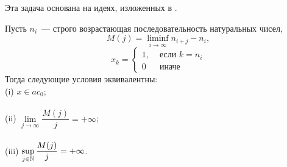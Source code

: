
Эта задача основана на идеях, изложенных в \cite[\S 5]{Semenov2014geomprops}.

\begin{theorem}
	\label{thm:M_j_ac0_inf_lim}
	Пусть $n_i$~--- строго возрастающая последовательность натуральных чисел,
	\begin{equation}
		\label{eq:definition_M_j}
		M(j) = \liminf_{i\to\infty} n_{i+j} - n_i,
	\end{equation}
	\begin{equation}
		x_k = \left\{\begin{array}{ll}
			1, & \mbox{~если~} k = n_i
			\\
			0  & \mbox{~иначе~}
		\end{array}\right.
	\end{equation}
	Тогда следующие условия эквивалентны:
	\\
	(i)   $x \in ac_0$;
	\\\\
	(ii)  $\lim\limits_{j \to \infty} \dfrac{M(j)}{j} = +\infty$;
	\\\\
	(iii) $\sup\limits_{j \in \mathbb{N}}     \dfrac{M(j)}{j} = +\infty$.
\end{theorem}


